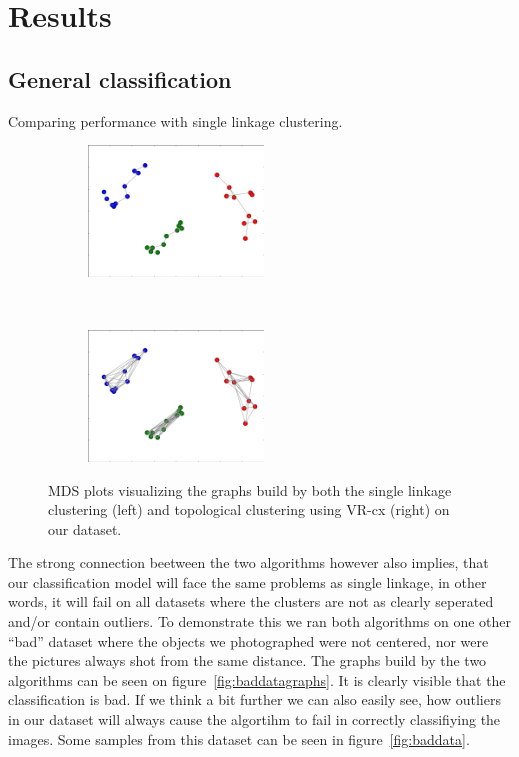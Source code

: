 \documentclass{article}
\newcommand{\enterProblemHeader}[1]{
}
\newcommand{\exitProblemHeader}[1]{
}
\newcounter{homeworkProblemCounter} %
\newcommand{\homeworkProblemName}{}
\newenvironment{homeworkProblem}[1][Problem \arabic{homeworkProblemCounter}]{ %
\stepcounter{homeworkProblemCounter} %
\renewcommand{\homeworkProblemName}{#1} %
\section{\homeworkProblemName} %
\enterProblemHeader{\homeworkProblemName} %
}{
\exitProblemHeader{\homeworkProblemName} %
}
\newcommand{\homeworkSectionName}{}
\newenvironment{homeworkSection}[1]{ %
\renewcommand{\homeworkSectionName}{#1} %
\subsection{\homeworkSectionName} %
\enterProblemHeader{\homeworkProblemName\ [\homeworkSectionName]} %
}{
\enterProblemHeader{\homeworkProblemName} %
}
\begin{document}
\begin{homeworkProblem}[Results]
\begin{homeworkSection}{General classification}
\begin{paragraph}{Comparing performance with single linkage clustering.}
\begin{figure}[t]
    \centering
    \begin{subfigure}[t]{0.4\textwidth}
        \centering
        \includegraphics[height=3.5cm]{img/SL_classes}
    \end{subfigure}
   ~
    \begin{subfigure}[t]{0.4\textwidth}
        \centering
        \includegraphics[height=3.5cm]{img/TC_classes}
        \end{subfigure}
  \caption{MDS plots visualizing the graphs build by both the single linkage clustering (left) and topological clustering using VR-cx (right) on our dataset.}
  \label{fig:sltcgraphs}
\end{figure}

The strong connection beetween the two algorithms however also implies, that our classification model will face the same problems as single linkage, in other words, it will fail on all datasets where the clusters are not as clearly seperated and/or contain outliers. To demonstrate this we ran both algorithms on one other ``bad'' dataset where the objects we photographed were not centered, nor were the pictures always shot from the same distance. The graphs build by the two algorithms can be seen on figure~\ref{fig:baddatagraphs}. It is clearly visible that the classification is bad. If we think a bit further we can also easily see, how outliers in our dataset will always cause the algortihm to fail in correctly classifiying the images. Some samples from this dataset can be seen in figure~\ref{fig:baddata}.


\end{paragraph}
\end{homeworkSection}
\end{homeworkProblem}
\end{document}
